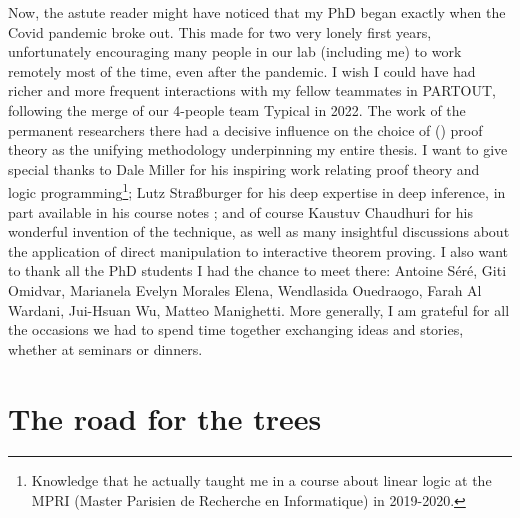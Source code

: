 Now, the astute reader might have noticed that my PhD began exactly when the Covid pandemic broke out. This made for two very lonely first years, unfortunately encouraging many people in our lab (including me) to work remotely most of the time, even after the pandemic. I wish I could have had richer and more frequent interactions with my fellow teammates in PARTOUT, following the merge of our 4-people team Typical in 2022. The work of the permanent researchers there had a decisive influence on the choice of () proof theory as the unifying methodology underpinning my entire thesis. I want to give special thanks to Dale Miller for his inspiring work relating proof theory and logic programming\footnote{Knowledge that he actually taught me in a course about linear logic at the MPRI (Master Parisien de Recherche en Informatique) in 2019-2020.}; Lutz Straßburger for his deep expertise in deep inference, in part available in his course notes \cite{tubella:hal-02390267}; and of course Kaustuv Chaudhuri for his wonderful invention of the  technique, as well as many insightful discussions about the application of direct manipulation to interactive theorem proving. I also want to thank all the PhD students I had the chance to meet there: Antoine Séré, Giti Omidvar, Marianela Evelyn Morales Elena, Wendlasida Ouedraogo, Farah Al Wardani, Jui-Hsuan Wu, Matteo Manighetti. More generally, I am grateful for all the occasions we had to spend time together exchanging ideas and stories, whether at seminars or dinners.

\section{The road for the trees}

